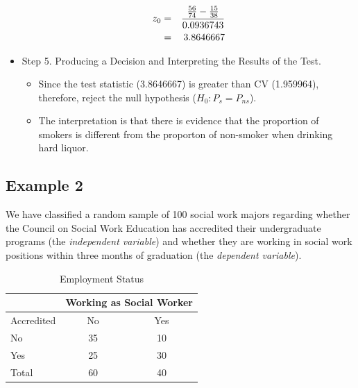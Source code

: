 \documentclass[11pt, chapterprefix=true]{scrbook}\usepackage[]{graphicx}\usepackage[]{color}
\begin{document}
\begin{itemize}
    \begin{eqnarray*}
    z_0 &=& \frac{\frac{56}{74} - \frac{15}{38}}{0.0936743} \\ \vspace{3mm}
        &=& 3.8646667
    \end{eqnarray*}

\item Step 5.  Producing a Decision and Interpreting the Results of the Test.
	\begin{itemize}
	\samepage
	\item Since the test statistic (3.8646667) is greater than CV (1.959964), therefore, reject the null hypothesis ($H_0: P_s = P_{ns}$).
	\samepage
	\item The interpretation is that there is evidence that the proportion of smokers is different from the proporton of non-smoker when drinking hard liquor.
	\end{itemize}
	 
\end{itemize}

\subsection{Example 2}    %

We have classified a random sample of 100 social work majors regarding whether the Council on Social Work Education has accredited their undergraduate programs (the \emph{independent variable}) and whether they are working in social work positions within three months of graduation (the \emph{dependent variable}).



\begin{table}[htbp]
   \centering
   \begin{tabular}{@{} lcc @{}} \hline %
     &  \multicolumn{2}{c}{ Working as Social Worker } \\ \hline
     Accredited   & No & Yes \\ \hline
     No           & 35 & 10 \\
     Yes          & 25 & 30 \\ \hline
     Total        & 60 & 40 \\ \hline
   \end{tabular}
   \caption{Employment Status}
   \label{tab:c10_2}
\end{table}
\end{document}
